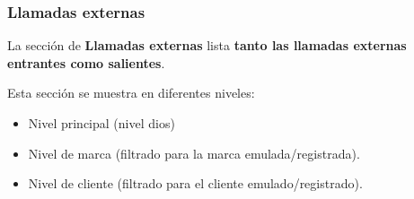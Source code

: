 \documentclass[letterpaper,10pt,spanish]{sphinxmanual}
\begin{document}
\subsubsection{Llamadas externas}
\label{administration_portal/client/wholesale/calls/external_calls::doc}\label{administration_portal/client/wholesale/calls/external_calls:external-calls}
La sección de \textbf{Llamadas externas} lista \textbf{tanto las llamadas externas entrantes como salientes}.

Esta sección se muestra en diferentes niveles:
\begin{itemize}
\item {} 
Nivel principal (nivel dios)

\item {} 
Nivel de marca (filtrado para la marca emulada/registrada).

\item {} 
Nivel de cliente (filtrado para el cliente emulado/registrado).

\end{itemize}
\end{document}
